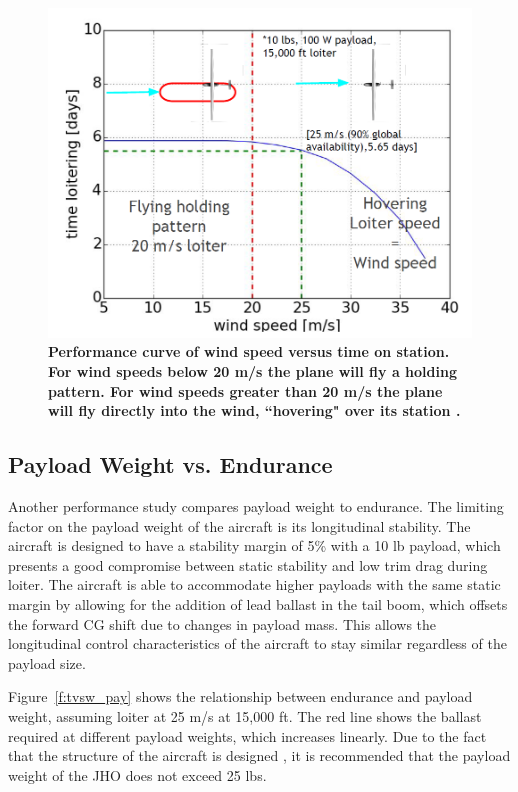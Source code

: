 \documentclass[journal]{aiaa-tc}%
\begin{document}
\begin{figure}[htbp!]
    \begin{center}
    \includegraphics[width = .65\textwidth]{Vwind_vs_tstation}
     \caption{ \textbf{Performance curve of wind speed versus time on station.  For wind speeds below 20 m/s the plane will fly a holding pattern.  For wind speeds greater than 20 m/s the plane will fly directly into the wind, ``hovering" over its station .} }
    \label{f:tvsv_wind}
    \end{center}
\end{figure}

\subsection{Payload Weight vs. Endurance} 
Another performance study compares payload weight to endurance. The limiting factor on the payload weight of the aircraft is its longitudinal stability. The aircraft is designed to have a stability margin of 5\% with a 10 lb payload, which presents a good compromise between static stability and low trim drag during loiter. The aircraft is able to accommodate higher payloads with the same static margin by allowing for the addition of lead ballast in the tail boom, which offsets the forward CG shift due to changes in payload mass. This allows the longitudinal control characteristics of the aircraft to stay similar regardless of the payload size. 

 Figure~\ref{f:tvsw_pay} shows the relationship between endurance and payload weight, assuming loiter at 25 m/s at 15,000 ft. The red line shows the ballast required at different payload weights, which increases linearly. Due to the fact that the structure of the aircraft is designed , it is recommended that the payload weight of the JHO does not exceed 25 lbs. 
\end{document}
